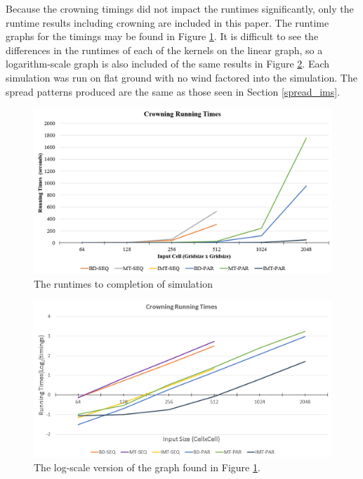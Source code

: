 Because the crowning timings did not impact the runtimes significantly, only the runtime results including crowning are included in this paper. The runtime graphs for the timings may be found in Figure \ref{fig:runtimes}. It is difficult to see the differences in the runtimes of each of the kernels on the linear graph, so a logarithm-scale graph is also included of the same results in Figure \ref{fig:runtimes_log}. Each simulation was run on flat ground with no wind factored into the simulation. The spread patterns produced are the same as those seen in Section \ref{spread_ims}. 
\begin{figure}%
\centering
  \includegraphics[width=\textwidth]{figures/results/crowning_reg.png}
  \caption{The runtimes to completion of simulation }
  \label{fig:runtimes}
\end{figure}  
\begin{figure}%
\centering
  \includegraphics[width=\textwidth]{figures/results/crowning_log.png}
  \caption{The log-scale version of the graph found in Figure \ref{fig:runtimes}.}
  \label{fig:runtimes_log}
\end{figure} 

